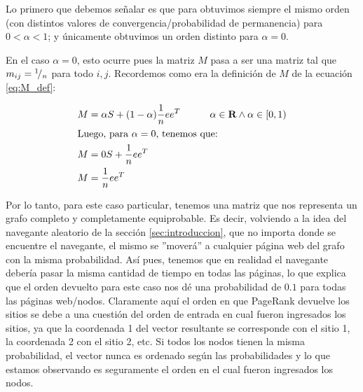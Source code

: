 \par Lo primero que debemos se\~nalar es que para obtuvimos siempre el mismo
orden (con distintos valores de convergencia/probabilidad de permanencia) para
$0 < \alpha < 1$; y \'unicamente obtuvimos un orden distinto para $\alpha = 0$.

\par En el caso $\alpha = 0$, esto ocurre pues la matriz $M$ pasa a ser una
matriz tal que $m_{ij} = {}^{1}\!/_{n}$ para todo $i,j$. Recordemos como era la
definici\'on de $M$ de la ecuaci\'on \ref{eq:M_def}:

\begin{align*}
    M &= \alpha S + (1-\alpha) \frac{1}{n}ee^T \quad\quad\quad \alpha\in\hbox{\bf R}
    \land \alpha\in\left[0,1\right)\\
    \intertext{Luego, para $\alpha = 0$, tenemos que:}
    M &= 0S + \frac{1}{n}ee^T\\
    M & = \frac{1}{n}ee^T
\end{align*}

\par Por lo tanto, para este caso particular, tenemos una matriz que nos
representa un grafo completo y completamente equiprobable. Es decir, volviendo a
la idea del navegante aleatorio de la secci\'on \ref{sec:introduccion}, que no
importa donde se encuentre el navegante, el mismo se ''mover\'a'' a cualquier
p\'agina web del grafo con la misma probabilidad. As\'i pues, tenemos que en
realidad el navegante deber\'ia pasar la misma cantidad de tiempo en todas las
p\'aginas, lo que explica que el orden devuelto para este caso nos d\'e una
probabilidad de $0.1$ para todas las p\'aginas web/nodos. Claramente aqu\'i el
orden en que PageRank devuelve los sitios se debe a una cuesti\'on del orden de
entrada en cual fueron ingresados los sitios, ya que la coordenada 1 del vector
resultante se corresponde con el sitio 1, la coordenada 2 con el sitio 2, etc.
Si todos los nodos tienen la misma probabilidad, el vector nunca es ordenado
seg\'un las probabilidades y lo que estamos observando es seguramente el orden
en el cual fueron ingresados los nodos.

